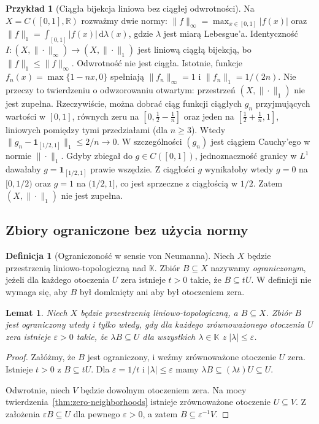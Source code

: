 \documentclass[11pt,a4paper]{article}
\numberwithin{equation}{section}
\theoremstyle{plain}
\newtheorem{lemat}[twierdzenie]{Lemat}
\theoremstyle{definition}
\newtheorem{definicja}[twierdzenie]{Definicja}
\newtheorem{przyklad}[twierdzenie]{Przykład}
\theoremstyle{remark}
\newcommand{\R}{\mathbb R}
\newcommand{\K}{\mathbb K}
\begin{document}
\begin{przyklad}[Ciągła bijekcja liniowa bez ciągłej odwrotności]
Na $X=C([0,1],\R)$ rozważmy dwie normy:
$\|f\|_\infty=\max_{x\in[0,1]}|f(x)|$ oraz
$\|f\|_1=\int_{[0,1]}|f(x)|\,\mathrm d\lambda(x)$,
gdzie $\lambda$ jest miarą Lebesgue'a.
Identyczność $I\colon(X,\|\cdot\|_\infty)\to(X,\|\cdot\|_1)$
jest liniową ciągłą bijekcją, bo $\|f\|_1\leq\|f\|_\infty$.
Odwrotność nie jest ciągła. Istotnie, funkcje
$f_n(x)=\max\{1-nx,0\}$ spełniają $\|f_n\|_\infty=1$
i $\|f_n\|_1=1/(2n)$.
Nie przeczy to twierdzeniu o odwzorowaniu otwartym:
przestrzeń $(X,\|\cdot\|_1)$ nie jest zupełna. Rzeczywiście,
można dobrać ciąg funkcji ciągłych $g_n$ przyjmujących wartości
w $[0,1]$, równych zeru na $[0,\tfrac12-\tfrac1n]$ oraz jeden
na $[\tfrac12+\tfrac1n,1]$, liniowych pomiędzy tymi przedziałami
(dla $n\geq3$). Wtedy
$\|g_n-\mathbf1_{[1/2,1]}\|_1\leq2/n\to0$.
W szczególności $(g_n)$ jest ciągiem Cauchy'ego w normie
$\|\cdot\|_1$. Gdyby zbiegał do $g\in C([0,1])$,
jednoznaczność granicy w $L^1$ dawałaby
$g=\mathbf1_{[1/2,1]}$ prawie wszędzie. Z ciągłości $g$
wynikałoby wtedy $g=0$ na $[0,1/2)$ oraz $g=1$ na
$(1/2,1]$, co jest sprzeczne z ciągłością w $1/2$.
Zatem $(X,\|\cdot\|_1)$ nie jest zupełna.
\end{przyklad}

\subsection{Zbiory ograniczone bez użycia normy}

\begin{definicja}[Ograniczoność w sensie von Neumanna]\label{def:tvs-bounded}
Niech $X$ będzie przestrzenią liniowo-topologiczną nad $\K$.
Zbiór $B\subseteq X$ nazywamy \emph{ograniczonym}, jeżeli
dla każdego otoczenia $U$ zera istnieje $t>0$ takie,
że $B\subseteq tU$. W definicji nie wymaga się, aby $B$
był domknięty ani aby był otoczeniem zera.
\end{definicja}

\begin{lemat}\label{lem:bounded-test}
Niech $X$ będzie przestrzenią liniowo-topologiczną, a $B\subseteq X$.
Zbiór $B$ jest ograniczony wtedy i tylko wtedy, gdy dla każdego
zrównoważonego otoczenia $U$ zera istnieje $\varepsilon>0$ takie,
że $\lambda B\subseteq U$ dla wszystkich $\lambda\in\K$
z $|\lambda|\leq\varepsilon$.
\end{lemat}
\begin{proof}
Załóżmy, że $B$ jest ograniczony, i weźmy zrównoważone
otoczenie $U$ zera. Istnieje $t>0$ z $B\subseteq tU$.
Dla $\varepsilon=1/t$ i $|\lambda|\leq\varepsilon$
mamy $\lambda B\subseteq(\lambda t)U\subseteq U$.

Odwrotnie, niech $V$ będzie dowolnym otoczeniem zera.
Na mocy twierdzenia~\ref{thm:zero-neighborhoods} istnieje
zrównoważone otoczenie $U\subseteq V$. Z założenia
$\varepsilon B\subseteq U$ dla pewnego $\varepsilon>0$,
a zatem $B\subseteq\varepsilon^{-1}V$.
\end{proof}
\end{document}
